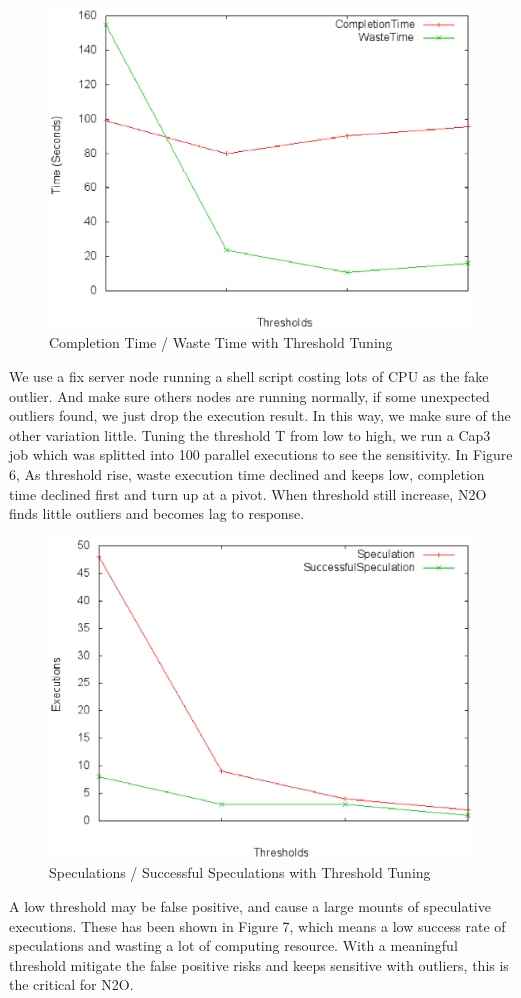 \begin{figure}
\centering
\includegraphics[width=0.9\columnwidth]{figures/threshold&completiontime.eps}
\caption{Completion Time / Waste Time with Threshold Tuning}
\label{figure:thresholdtuning}
\end{figure}

We use a fix server node running a shell script costing lots of CPU as the fake outlier. And make sure others nodes are running normally, if some unexpected outliers found, we just drop the execution result. In this way, we make sure of the other variation little. Tuning the threshold T from low to high, we run a Cap3 job which was splitted into 100 parallel executions to see the sensitivity. In Figure 6, As threshold rise, waste execution time declined and keeps low, completion time declined first and  turn up at a pivot. When threshold still increase, N2O finds little outliers and becomes lag to response. 

\begin{figure}
\centering
\includegraphics[width=0.9\columnwidth]{figures/threshold&speculation.eps}
\caption{Speculations / Successful Speculations with Threshold Tuning}
\label{figure:yetanotherthresholdtuning}
\end{figure}

A low threshold may be false positive, and cause a large mounts of speculative executions. These has been shown in Figure 7, which means a low success rate of speculations and wasting a lot of computing resource. With a meaningful threshold mitigate the false positive risks and keeps sensitive with outliers, this is the critical for N2O.
